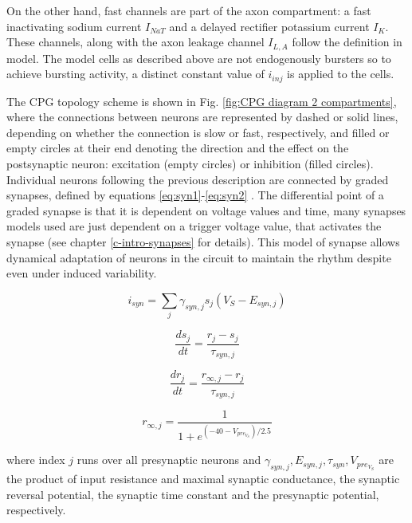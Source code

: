 On the other hand, fast channels are part of the axon compartment: a fast inactivating sodium current $I_{NaT}$ and a delayed rectifier potassium current $I_{K}$. These channels, along with the axon leakage channel  $I_{L,A}$ follow the definition in \textcite{hodgkin_quantitative_1952} model. The model cells as described above are not endogenously bursters so to achieve bursting activity, a distinct constant value of  \(i_{inj}\) is applied to the cells. 

The CPG topology scheme is shown in Fig. \ref{fig:CPG diagram 2 compartments}, where the connections between neurons are represented by dashed or solid lines, depending on whether the connection is slow or fast, respectively, and filled or empty circles at their end denoting the direction and the effect on the postsynaptic neuron: excitation (empty circles) or inhibition (filled circles).
Individual neurons following the previous description are connected by graded synapses, defined by equations \ref{eq:syn1}-\ref{eq:syn2} \parencite{vavoulis_dynamic_2007}. The differential point of a graded synapse is that it is dependent on voltage values and time, many synapses models used are just dependent on a trigger voltage value, that activates the synapse (see chapter \ref{c-intro-synapses} for details). This model of synapse allows dynamical adaptation of neurons in the circuit to maintain the rhythm despite even under induced variability. 

\begin{equation}
	i_{syn} = \sum_j \gamma_{syn,j} s_j (V_S - E_{syn,j})
	\label{eq:syn1}
\end{equation}

\begin{equation}
	\frac{ds_j}{dt} = \frac{r_{j}-s_j}{\tau_{syn,j}}
\end{equation}

\begin{equation}
	\frac{dr_j}{dt} = \frac{r_{\infty,j}-r_j}{\tau_{syn,j}}
\end{equation}

\begin{equation}
	r_{\infty,j}=\frac{1}{1+e^{(-40-V_{pre_{V_S}})/2.5}}
	\label{eq:syn2}
\end{equation}


\noindent where index $j$ runs over all presynaptic neurons and \(\gamma_{syn,j}, E_{syn,j},\tau_{syn},V_{pre_{V_S}}\) are the product of input resistance and maximal synaptic conductance, the synaptic reversal potential, the synaptic time constant and the presynaptic potential, respectively. 


